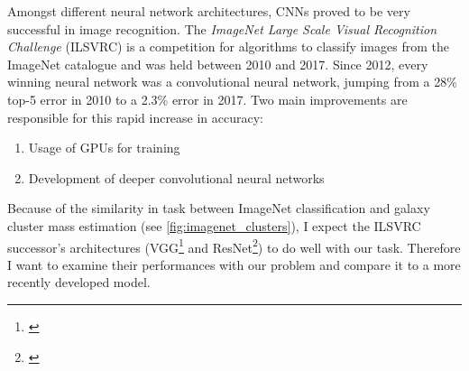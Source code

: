 Amongst different neural network architectures, CNNs proved to be very successful in image recognition. The \textit{ImageNet Large Scale Visual Recognition Challenge} (ILSVRC) is a competition for algorithms to classify images from the ImageNet catalogue and was held between 2010 and 2017. Since 2012, every winning neural network was a convolutional neural network, jumping from a 28\% top-5 error in 2010 to a 2.3\% error in 2017. Two main improvements are responsible for this rapid increase in accuracy:\\

\begin{enumerate}
    \item Usage of GPUs for training
    \item Development of deeper convolutional neural networks
\end{enumerate}

Because of the similarity in task between ImageNet classification and galaxy cluster mass estimation (see \autoref{fig:imagenet_clusters}), I expect the ILSVRC successor's architectures (VGG\footnote{\citet{Simonyan_2015}} and ResNet\footnote{\citet{He_2016}}) to do well with our task. Therefore I want to examine their performances with our problem and compare it to a more recently developed model. 
